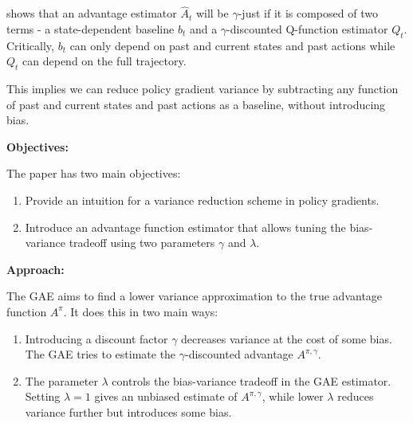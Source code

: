 \documentclass{article}
\begin{document}
 shows that an advantage estimator $\hat{A}_t$ will be $\gamma$-just if it is composed of two terms - a state-dependent baseline $b_t$ and a $\gamma$-discounted Q-function estimator $Q_t$. Critically, $b_t$ can only depend on past and current states and past actions while $Q_t$ can depend on the full trajectory.

This implies we can reduce policy gradient variance by subtracting any function of past and current states and past actions as a baseline, without introducing bias.


\textbf{Objectives:}

The paper has two main objectives:

\begin{enumerate}
\item Provide an intuition for a variance reduction scheme in policy gradients.

\item Introduce an advantage function estimator that allows tuning the bias-variance tradeoff using two parameters $\gamma$ and $\lambda$.

\end{enumerate}

\textbf{Approach:}

The GAE aims to find a lower variance approximation to the true advantage function $A^{\pi}$. It does this in two main ways:

\begin{enumerate}
\item Introducing a discount factor $\gamma$ decreases variance at the cost of some bias. The GAE tries to estimate the $\gamma$-discounted advantage $A^{\pi,\gamma}$.

\item The parameter $\lambda$ controls the bias-variance tradeoff in the GAE estimator. Setting $\lambda=1$ gives an unbiased estimate of $A^{\pi,\gamma}$, while lower $\lambda$ reduces variance further but introduces some bias.
\end{enumerate}
\end{document}
